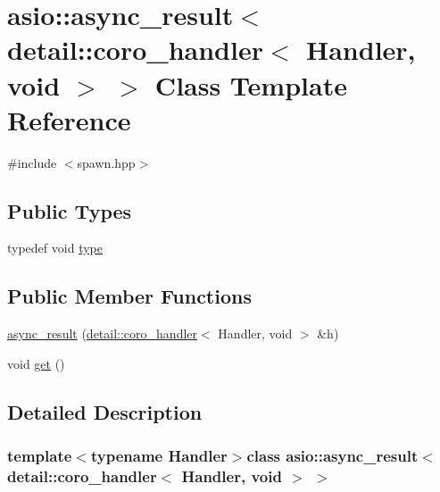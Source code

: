 \hypertarget{classasio_1_1async__result_3_01detail_1_1coro__handler_3_01_handler_00_01void_01_4_01_4}{}\section{asio\+:\+:async\+\_\+result$<$ detail\+:\+:coro\+\_\+handler$<$ Handler, void $>$ $>$ Class Template Reference}
\label{classasio_1_1async__result_3_01detail_1_1coro__handler_3_01_handler_00_01void_01_4_01_4}


{\ttfamily \#include $<$spawn.\+hpp$>$}

\subsection*{Public Types}
\begin{DoxyCompactItemize}
\item 
typedef void \hyperlink{classasio_1_1async__result_3_01detail_1_1coro__handler_3_01_handler_00_01void_01_4_01_4_a00ee10c54a413e044b8a4c70080e3c8e}{type}
\end{DoxyCompactItemize}
\subsection*{Public Member Functions}
\begin{DoxyCompactItemize}
\item 
\hyperlink{classasio_1_1async__result_3_01detail_1_1coro__handler_3_01_handler_00_01void_01_4_01_4_aa12f674a018987f457e013456c627aeb}{async\+\_\+result} (\hyperlink{classasio_1_1detail_1_1coro__handler}{detail\+::coro\+\_\+handler}$<$ Handler, void $>$ \&h)
\item 
void \hyperlink{classasio_1_1async__result_3_01detail_1_1coro__handler_3_01_handler_00_01void_01_4_01_4_a8cd734b679a190c83e755f0fb80d185a}{get} ()
\end{DoxyCompactItemize}


\subsection{Detailed Description}
\subsubsection*{template$<$typename Handler$>$class asio\+::async\+\_\+result$<$ detail\+::coro\+\_\+handler$<$ Handler, void $>$ $>$}



